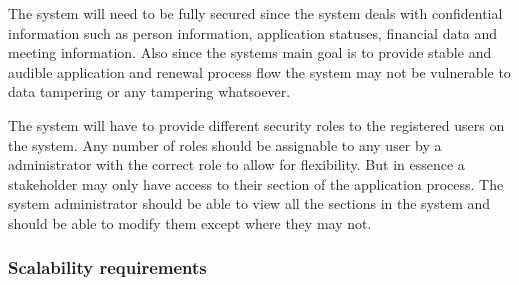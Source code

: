 \documentclass[12pt]{article}
\begin{document}
\begin{flushleft}

The system will need to be fully secured since the system deals with confidential information such as person information, application statuses, financial data and meeting information. Also since the systems main goal is to provide stable and audible application and renewal process flow the system may not be vulnerable to data tampering or any tampering whatsoever. \\
\vspace{0.1in}

The system will have to provide different security roles to the registered users on the system. Any number of roles should be assignable to any user by a administrator with the correct role to allow for flexibility.
But in essence a stakeholder may only have access to their section of the application process. The system administrator should be able to view all the sections in the system and should be able to modify them except where they may not.

\end{flushleft}

\vspace{0.1in}

\subsubsection{Scalability requirements}
\end{document}
